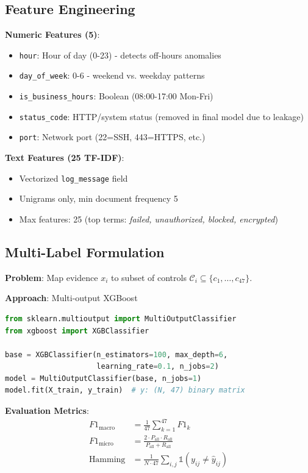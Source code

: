 \documentclass[11pt,conference]{IEEEtran}
\begin{document}
\subsection{Feature Engineering}

\textbf{Numeric Features (5)}:
\begin{itemize}
    \item \texttt{hour}: Hour of day (0-23) - detects off-hours anomalies
    \item \texttt{day\_of\_week}: 0-6 - weekend vs. weekday patterns
    \item \texttt{is\_business\_hours}: Boolean (08:00-17:00 Mon-Fri)
    \item \texttt{status\_code}: HTTP/system status (removed in final model due to leakage)
    \item \texttt{port}: Network port (22=SSH, 443=HTTPS, etc.)
\end{itemize}

\textbf{Text Features (25 TF-IDF)}:
\begin{itemize}
    \item Vectorized \texttt{log\_message} field
    \item Unigrams only, min document frequency 5
    \item Max features: 25 (top terms: \textit{failed, unauthorized, blocked, encrypted})
\end{itemize}

\subsection{Multi-Label Formulation}

\textbf{Problem}: Map evidence $x_i$ to subset of controls $\mathcal{C}_i \subseteq \{c_1, \ldots, c_{47}\}$.

\textbf{Approach}: Multi-output XGBoost
\begin{lstlisting}[language=Python]
from sklearn.multioutput import MultiOutputClassifier
from xgboost import XGBClassifier

base = XGBClassifier(n_estimators=100, max_depth=6,
                     learning_rate=0.1, n_jobs=2)
model = MultiOutputClassifier(base, n_jobs=1)
model.fit(X_train, y_train)  # y: (N, 47) binary matrix
\end{lstlisting}

\textbf{Evaluation Metrics}:
\begin{align}
F1_{\text{macro}} &= \frac{1}{47}\sum_{k=1}^{47} F1_k \\
F1_{\text{micro}} &= \frac{2 \cdot P_{\text{all}} \cdot R_{\text{all}}}{P_{\text{all}} + R_{\text{all}}} \\
\text{Hamming} &= \frac{1}{N \cdot 47}\sum_{i,j} \mathbb{1}(y_{ij} \neq \hat{y}_{ij})
\end{align}
\end{document}
